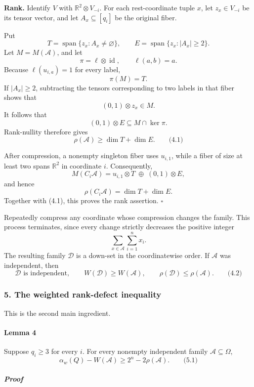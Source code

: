 \documentclass[
  11pt,
  a4paper,
]{article}
\newcounter{none} %
\begin{document}
\textbf{Rank.} Identify \(V\) with \(\mathbb R^2\otimes V_{-i}\). For
each rest-coordinate tuple \(x\), let \(z_x\in V_{-i}\) be its tensor
vector, and let \(A_x\subseteq[q_i]\) be the original fiber.

Put \[
T=\operatorname{span}\{z_x:A_x\ne\varnothing\},
\qquad
E=\operatorname{span}\{z_x:|A_x|\ge2\}.
\] Let \(M=M(\mathcal A)\), and let \[
\pi=\ell\otimes\operatorname{id},
\qquad
\ell(a,b)=a.
\] Because \(\ell(u_{i,a})=1\) for every label, \[
\pi(M)=T.
\] If \(|A_x|\ge2\), subtracting the tensors corresponding to two labels
in that fiber shows that \[
(0,1)\otimes z_x\in M.
\] It follows that \[
(0,1)\otimes E\subseteq M\cap\ker\pi.
\] Rank-nullity therefore gives \[
\rho(\mathcal A)\ge\dim T+\dim E.
\qquad\text{(4.1)}
\]

After compression, a nonempty singleton fiber uses \(u_{i,1}\), while a
fiber of size at least two spans \(\mathbb R^2\) in coordinate \(i\).
Consequently, \[
M(C_i\mathcal A)
=
u_{i,1}\otimes T
\;\oplus\;
(0,1)\otimes E,
\] and hence \[
\rho(C_i\mathcal A)=\dim T+\dim E.
\] Together with (4.1), this proves the rank assertion. \(\square\)

Repeatedly compress any coordinate whose compression changes the family.
This process terminates, since every change strictly decreases the
positive integer \[
\sum_{x\in\mathcal A}\sum_{i=1}^{n}x_i.
\] The resulting family \(\mathcal D\) is a down-set in the
coordinatewise order. If \(\mathcal A\) was independent, then \[
\mathcal D\text{ is independent},\qquad
W(\mathcal D)\ge W(\mathcal A),\qquad
\rho(\mathcal D)\le\rho(\mathcal A).
\qquad\text{(4.2)}
\]

\subsubsection{5. The weighted rank-defect
inequality}\label{the-weighted-rank-defect-inequality}

This is the second main ingredient.

\paragraph{Lemma 4}\label{lemma-4}

Suppose \(q_i\ge3\) for every \(i\). For every nonempty independent
family \(\mathcal A\subseteq\Omega\), \[
\boxed{\alpha_w(Q)-W(\mathcal A)\ge 2^n-2\rho(\mathcal A).}
\qquad\text{(5.1)}
\]

\subparagraph{Proof}\label{proof-3}
\end{document}
